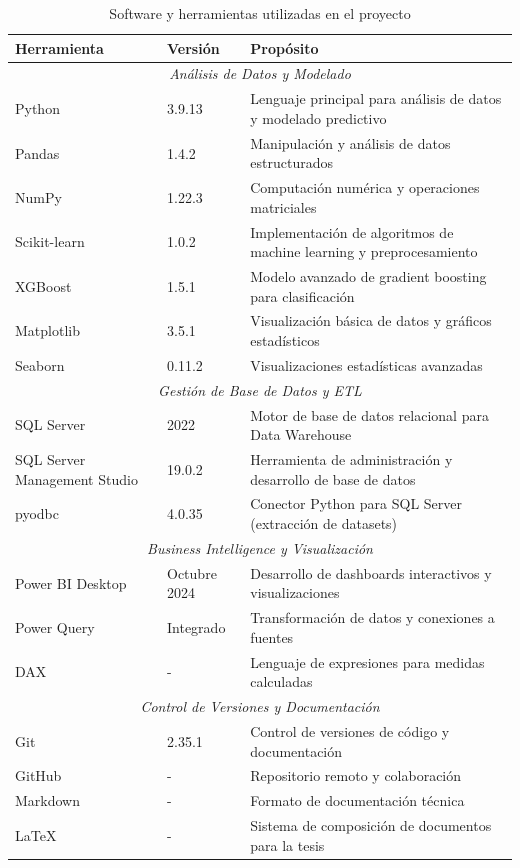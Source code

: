 \begin{table}[ht]
\centering
\begin{tabular}{|p{3.5cm}|p{2.5cm}|p{8.5cm}|}
\hline
\textbf{Herramienta} & \textbf{Versión} & \textbf{Propósito} \\
\hline
\multicolumn{3}{|c|}{\textit{Análisis de Datos y Modelado}} \\
\hline
Python & 3.9.13 & Lenguaje principal para análisis de datos y modelado predictivo \\
\hline
Pandas & 1.4.2 & Manipulación y análisis de datos estructurados \\
\hline
NumPy & 1.22.3 & Computación numérica y operaciones matriciales \\
\hline
Scikit-learn & 1.0.2 & Implementación de algoritmos de machine learning y preprocesamiento \\
\hline
XGBoost & 1.5.1 & Modelo avanzado de gradient boosting para clasificación \\
\hline
Matplotlib & 3.5.1 & Visualización básica de datos y gráficos estadísticos \\
\hline
Seaborn & 0.11.2 & Visualizaciones estadísticas avanzadas \\
\hline
\multicolumn{3}{|c|}{\textit{Gestión de Base de Datos y ETL}} \\
\hline
SQL Server & 2022 & Motor de base de datos relacional para Data Warehouse \\
\hline
SQL Server Management Studio & 19.0.2 & Herramienta de administración y desarrollo de base de datos \\
\hline
pyodbc & 4.0.35 & Conector Python para SQL Server (extracción de datasets) \\
\hline
\multicolumn{3}{|c|}{\textit{Business Intelligence y Visualización}} \\
\hline
Power BI Desktop & Octubre 2024 & Desarrollo de dashboards interactivos y visualizaciones \\
\hline
Power Query & Integrado & Transformación de datos y conexiones a fuentes \\
\hline
DAX & - & Lenguaje de expresiones para medidas calculadas \\
\hline
\multicolumn{3}{|c|}{\textit{Control de Versiones y Documentación}} \\
\hline
Git & 2.35.1 & Control de versiones de código y documentación \\
\hline
GitHub & - & Repositorio remoto y colaboración \\
\hline
Markdown & - & Formato de documentación técnica \\
\hline
LaTeX & - & Sistema de composición de documentos para la tesis \\
\hline
\end{tabular}
\caption{Software y herramientas utilizadas en el proyecto}
\end{table}
    \newpage
    
